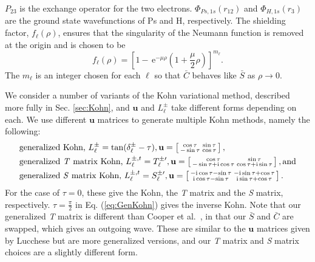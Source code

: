 \documentclass[reprint,showpacs,preprintnumbers,amsmath,amssymb,pra,aps]{revtex4-1}
\newcommand{\ee} {\,\text{e}}
\newcommand{\ii}{{\rm{i}}}
\begin{document}
$P_{23}$ is the exchange operator for the two electrons. $\Phi_{Ps,1s}\left(r_{12}\right)$ and $\Phi_{H,1s}\left(r_3\right)$ are the ground state wavefunctions of Ps and H, respectively. The shielding factor, $f_\ell(\rho)$, ensures that the singularity of the Neumann function is removed at the origin and is chosen to be
\begin{equation}
f_\ell(\rho) = \left[1 - \ee^{-\mu \rho} \left(1+\frac{\mu}{2}\rho\right)\right]^{m_\ell}.
\label{eq:PartialWaveShielding}
\end{equation}
The $m_\ell$ is an integer chosen for each $\ell$ so that $\bar{C}$ behaves like $\bar{S}$ as $\rho \rightarrow 0$.

We consider a number of variants of the Kohn variational method, described more fully in Sec. \ref{sec:Kohn}, and $\textbf{u}$ and $L^{\pm}_\ell$ take different forms depending on each. We use different $\textbf{u}$ matrices to generate multiple Kohn methods, namely the following:
\begin{subequations}
\label{eq:KohnU}
\begin{align}
&\text{generalized Kohn, } L^{\pm}_\ell = \tan(\delta^{\pm}_\ell-\tau), \textbf{u} = \left[ \begin{smallmatrix}
\cos \tau & \sin \tau \\  -\sin \tau & \cos \tau
\end{smallmatrix} \right], \label{eq:GenKohn}\\
&\text{generalized \emph{T} matrix Kohn, } L^{\pm,t}_\ell = T_\ell^{\pm\prime}, \textbf{u} = \left[ \begin{smallmatrix}
\cos\tau & \sin\tau \\ -\sin\tau + \ii \cos\tau & \cos\tau + \ii \sin\tau
\end{smallmatrix} \right], \text{and}\label{eq:GenTKohn} \\
&\text{generalized \emph{S} matrix Kohn, } L^{\pm,t}_\ell = S_\ell^{\pm\prime}, \textbf{u} = \left[ \begin{smallmatrix}
-\ii \cos\tau - \sin\tau & -\ii\sin\tau + \cos\tau \\ \ii\cos\tau - \sin\tau & \ii\sin\tau + \cos\tau
\end{smallmatrix} \right]. \label{eq:GenSKohn}
\end{align}
\end{subequations}
For the case of $\tau = 0$, these give the Kohn, the \emph{T} matrix and the \emph{S} matrix, respectively. $\tau = \frac{\pi}{2}$ in Eq. (\ref{eq:GenKohn}) gives the inverse Kohn. Note that our generalized \emph{T} matrix is different than Cooper et al.\ \cite{Cooper2010}, in that our $\bar{S}$ and $\bar{C}$ are swapped, which gives an outgoing wave. These are similar to the $\textbf{u}$ matrices given by Lucchese \cite{Lucchese1989} but are more generalized versions, and our \emph{T} matrix and \emph{S} matrix choices are a slightly different form.
\end{document}
